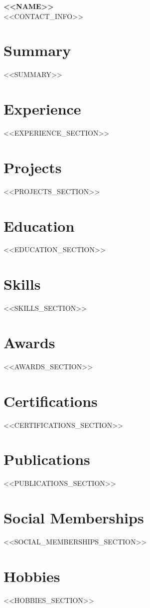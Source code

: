 \documentclass[<<FONT_SIZE>>,a4paper]{article}
\begin{document}
\begin{center}
    {\Huge \textbf{<<NAME>>}} \\
    \vspace{1mm}
    {<<CONTACT_INFO>>}
\end{center}

\vspace{2mm}

\section*{Summary}
<<SUMMARY>>

\section*{Experience}
<<EXPERIENCE_SECTION>>

\section*{Projects}
<<PROJECTS_SECTION>>

\section*{Education}
<<EDUCATION_SECTION>>

\section*{Skills}
<<SKILLS_SECTION>>

\section*{Awards}
<<AWARDS_SECTION>>

\section*{Certifications}
<<CERTIFICATIONS_SECTION>>

\section*{Publications}
<<PUBLICATIONS_SECTION>>

\section*{Social Memberships}
<<SOCIAL_MEMBERSHIPS_SECTION>>

\section*{Hobbies}
<<HOBBIES_SECTION>>
\end{document}
